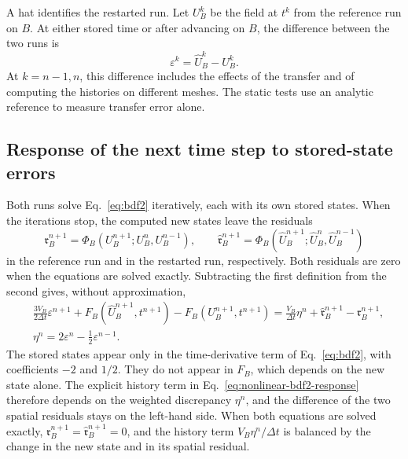 \documentclass[a4paper,fleqn]{cas-sc}
\newcommand{\eps}{\varepsilon}
\begin{document}
A hat identifies the restarted run. Let $U_B^k$ be the field at $t^k$ from the reference run on $B$. At either stored time or after advancing on $B$, the difference between the two runs is
\begin{equation}
\eps^k=\widehat U_B^k-U_B^k.
 \label{eq:history-defects}
\end{equation}
At $k=n-1,n$, this difference includes the effects of the transfer and of computing the histories on different meshes. The static tests use an analytic reference to measure transfer error alone.

\subsection{Response of the next time step to stored-state errors}
\label{sec:state-response}

Both runs solve Eq.~\eqref{eq:bdf2} iteratively, each with its own stored states. When the iterations stop, the computed new states leave the residuals
\[
 \mathfrak r_B^{n+1}=\Phi_B(U_B^{n+1};U_B^n,U_B^{n-1}),\qquad
 \widehat{\mathfrak r}_B^{n+1}=\Phi_B(\widehat U_B^{n+1};\widehat U_B^n,\widehat U_B^{n-1})
\]
in the reference run and in the restarted run, respectively. Both residuals are zero when the equations are solved exactly. Subtracting the first definition from the second gives, without approximation,
\begin{equation}
\begin{aligned}
 &\frac{3V_B}{2\Delta t}\eps^{n+1}
   +F_B(\widehat U_B^{n+1},t^{n+1})-F_B(U_B^{n+1},t^{n+1})
 =\frac{V_B}{\Delta t}\eta^n
   +\widehat{\mathfrak r}_B^{n+1}-\mathfrak r_B^{n+1},\\
 &\eta^n=2\eps^n-\tfrac12\eps^{n-1}.
\end{aligned}
\label{eq:nonlinear-bdf2-response}
\end{equation}
The stored states appear only in the time-derivative term of Eq.~\eqref{eq:bdf2}, with coefficients $-2$ and $1/2$. They do not appear in $F_B$, which depends on the new state alone. The explicit history term in Eq.~\eqref{eq:nonlinear-bdf2-response} therefore depends on the weighted discrepancy $\eta^n$, and the difference of the two spatial residuals stays on the left-hand side. When both equations are solved exactly, $\mathfrak r_B^{n+1}=\widehat{\mathfrak r}_B^{n+1}=0$, and the history term $V_B\eta^n/\Delta t$ is balanced by the change in the new state and in its spatial residual.
\end{document}
